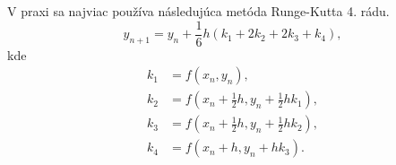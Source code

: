 V praxi sa najviac používa následujúca metóda Runge-Kutta 4. rádu.
\[ y_{n+1} = y_n + \frac{1}{6}h(k_1 + 2k_2 + 2k_3 + k_4), \]
kde
\begin{align*}
k_1 &= f(x_n, y_n), \\
k_2 &= f(x_n + \frac{1}{2}h, y_n + \frac{1}{2}hk_1), \\
k_3 &= f(x_n + \frac{1}{2}h, y_n + \frac{1}{2}hk_2), \\
k_4 &= f(x_n + h, y_n + hk_3). \\
\end{align*}